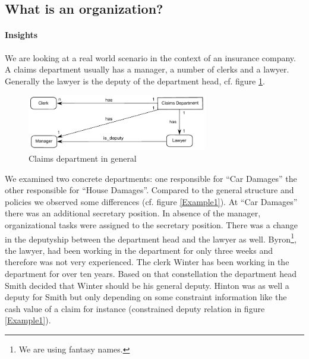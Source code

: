 \subsection{What is an organization?}

\paragraph{Insights}
We are looking at a real world scenario in the context of an insurance company. 
A claims department usually has a manager, a number of clerks and a lawyer. Generally the lawyer is the deputy of the department head, cf. figure \ref{GeneralDep}.
	\begin{figure}[htb!]
	\centering
	\includegraphics[width=0.7\textwidth]{Figures/ExampleDepartmentGeneral.pdf}
	\caption{Claims department in general}
	\label{GeneralDep}
	\end{figure}

We examined two concrete departments: one responsible for ``Car Damages'' the other responsible for ``House Damages''. Compared to the general structure and policies we observed some differences (cf. figure \ref{Example1}). At ``Car Damages'' there was an additional secretary position. In absence of the manager, organizational tasks were assigned to the secretary position. There was a change in the deputyship between the department head and the lawyer as well. Byron\footnote{We are using fantasy names.}, the lawyer, had been working in the department for only three weeks and therefore was not very experienced. The clerk Winter has been working in the department for over ten years. Based on that constellation the department head Smith decided that Winter should be his general deputy. Hinton was as well a deputy for Smith but only depending on some constraint information like the cash value of a claim for instance (constrained deputy relation in figure \ref{Example1}).

